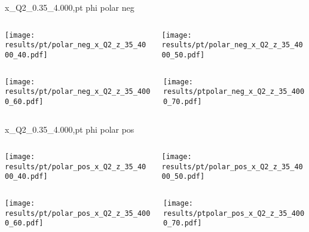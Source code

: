 \begin{frame}{x\_Q2\_0.35\_4.000,pt phi polar neg}
\begin{columns}
\begin{column}[T]{0.5\textwidth}
\texttt{[image: results/pt/polar\_neg\_x\_Q2\_z\_35\_4000\_40.pdf]}
\end{column}
\begin{column}[T]{0.5\textwidth}
\texttt{[image: results/pt/polar\_neg\_x\_Q2\_z\_35\_4000\_50.pdf]}
\end{column}
\end{columns}
\begin{columns}
\begin{column}[T]{0.5\textwidth}
\texttt{[image: results/pt/polar\_neg\_x\_Q2\_z\_35\_4000\_60.pdf]}
\end{column}
\begin{column}[T]{0.5\textwidth}
\texttt{[image: results/ptpolar\_neg\_x\_Q2\_z\_35\_4000\_70.pdf]}
\end{column}
\end{columns}
\end{frame}
\begin{frame}{x\_Q2\_0.35\_4.000,pt phi polar pos}
\begin{columns}
\begin{column}[T]{0.5\textwidth}
\texttt{[image: results/pt/polar\_pos\_x\_Q2\_z\_35\_4000\_40.pdf]}
\end{column}
\begin{column}[T]{0.5\textwidth}
\texttt{[image: results/pt/polar\_pos\_x\_Q2\_z\_35\_4000\_50.pdf]}
\end{column}
\end{columns}
\begin{columns}
\begin{column}[T]{0.5\textwidth}
\texttt{[image: results/pt/polar\_pos\_x\_Q2\_z\_35\_4000\_60.pdf]}
\end{column}
\begin{column}[T]{0.5\textwidth}
\texttt{[image: results/ptpolar\_pos\_x\_Q2\_z\_35\_4000\_70.pdf]}
\end{column}
\end{columns}
\end{frame}
